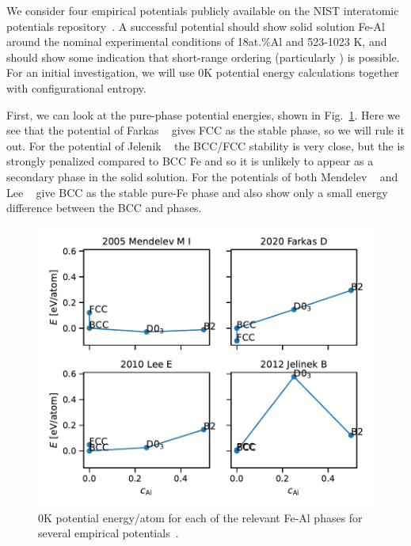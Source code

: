 We consider four empirical potentials \cite{mendelev2005effect, lee2010modified, jelinek2012modified, farkas2020model} publicly available on the NIST interatomic potentials repository~\cite{nist}.
A successful potential should show solid solution Fe-Al around the nominal experimental conditions of 18at.\%Al and 523-1023 K, and should show some indication that short-range ordering (particularly \DOTHREE) is possible.
For an initial investigation, we will use 0K potential energy calculations together with configurational entropy.

First, we can look at the pure-phase potential energies, shown in Fig.~\ref{fig:0K_phases}.
Here we see that the potential of Farkas \etal~\cite{farkas2020model} gives FCC as the stable phase, so we will rule it out.
For the potential of Jelenik \etal~\cite{jelinek2012modified} the BCC/FCC stability is very close, but the \DOTHREE is strongly penalized compared to BCC Fe and so it is unlikely to appear as a secondary phase in the solid solution.
For the potentials of both Mendelev \etal~\cite{mendelev2005effect} and Lee \etal~\cite{lee2010modified} give BCC as the stable pure-Fe phase and also show only a small energy difference between the BCC and \DOTHREE phases.
%
\begin{figure}[h]
    \label{fig:0K_phases}
    \centering
    \includegraphics[width=\textwidth]{figures/zerok_phases}
    \caption{0K potential energy/atom for each of the relevant Fe-Al phases for several empirical potentials~\cite{mendelev2005effect, lee2010modified, jelinek2012modified, farkas2020model}.}
\end{figure}
%

